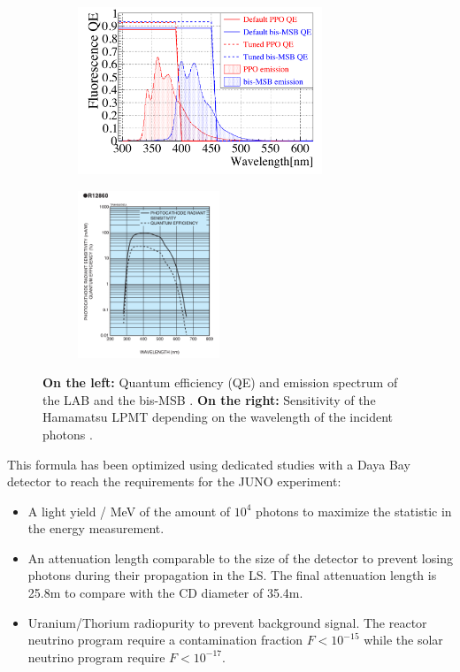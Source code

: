 \begin{figure}[ht]
  \centering
  \begin{subfigure}[b]{0.48\textwidth}
    \centering
    \includegraphics[height=5cm]{images/juno/LS_spectrum.png}
  \end{subfigure}
  \hfill
  \begin{subfigure}[b]{0.48\textwidth}
    \centering
    \includegraphics[height=5cm]{images/juno/LPMT_efficiency.png}
  \end{subfigure}
  \caption{\textbf{On the left:} Quantum efficiency (QE) and emission spectrum of the LAB and the bis-MSB \cite{bay_optimization_2020}. \textbf{On the right:} Sensitivity of the Hamamatsu LPMT depending on the wavelength of the incident photons \cite{noauthor_photomultiplier_nodate}.}
  \label{fig:juno:LS_spectrum_and_PMT_sensitivity}
\end{figure}

This formula has been optimized using dedicated studies with a Daya Bay detector \cite{bay_optimization_2020, zhang_complete_2020} to reach the requirements for the JUNO experiment:
\begin{itemize}
  \item A light yield / MeV of the amount of $10^4$ photons to maximize the statistic in the energy measurement.
  \item An attenuation length comparable to the size of the detector to prevent losing photons during their propagation in the LS. The final attenuation length is 25.8m \cite{yang_light_2017} to compare with the CD diameter of 35.4m.
  \item Uranium/Thorium radiopurity to prevent background signal. The reactor neutrino program require a contamination fraction $F<10^{-15}$ while the solar neutrino program require $F<10^{-17}$.
\end{itemize}

